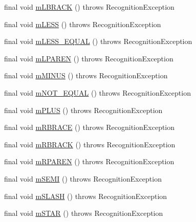 \begin{DoxyCompactItemize}
final void \hyperlink{classorg_1_1tzi_1_1use_1_1parser_1_1ocl_1_1_o_c_l_lexer_a42b9aa333e58bce7ce0967a51a318694}{m\-L\-B\-R\-A\-C\-K} ()  throws Recognition\-Exception 
\item 
final void \hyperlink{classorg_1_1tzi_1_1use_1_1parser_1_1ocl_1_1_o_c_l_lexer_a81843f6fa74e795661f7d3e13102f2b5}{m\-L\-E\-S\-S} ()  throws Recognition\-Exception 
\item 
final void \hyperlink{classorg_1_1tzi_1_1use_1_1parser_1_1ocl_1_1_o_c_l_lexer_a7a48716a6d69e4e96d5d1a8af6eb2747}{m\-L\-E\-S\-S\-\_\-\-E\-Q\-U\-A\-L} ()  throws Recognition\-Exception 
\item 
final void \hyperlink{classorg_1_1tzi_1_1use_1_1parser_1_1ocl_1_1_o_c_l_lexer_a8268b122b90467724d9953a17f870951}{m\-L\-P\-A\-R\-E\-N} ()  throws Recognition\-Exception 
\item 
final void \hyperlink{classorg_1_1tzi_1_1use_1_1parser_1_1ocl_1_1_o_c_l_lexer_ac78c30e5bfe199564bd00dbe08185555}{m\-M\-I\-N\-U\-S} ()  throws Recognition\-Exception 
\item 
final void \hyperlink{classorg_1_1tzi_1_1use_1_1parser_1_1ocl_1_1_o_c_l_lexer_a1b1d37ca767b3a0e3c2c9f7c875917a5}{m\-N\-O\-T\-\_\-\-E\-Q\-U\-A\-L} ()  throws Recognition\-Exception 
\item 
final void \hyperlink{classorg_1_1tzi_1_1use_1_1parser_1_1ocl_1_1_o_c_l_lexer_a75b738f6272dd7be405d82e39cd34253}{m\-P\-L\-U\-S} ()  throws Recognition\-Exception 
\item 
final void \hyperlink{classorg_1_1tzi_1_1use_1_1parser_1_1ocl_1_1_o_c_l_lexer_a28e9f866f1f062d0b69e951d1e029bb8}{m\-R\-B\-R\-A\-C\-E} ()  throws Recognition\-Exception 
\item 
final void \hyperlink{classorg_1_1tzi_1_1use_1_1parser_1_1ocl_1_1_o_c_l_lexer_a71252bae466b20065159d5517775c8cb}{m\-R\-B\-R\-A\-C\-K} ()  throws Recognition\-Exception 
\item 
final void \hyperlink{classorg_1_1tzi_1_1use_1_1parser_1_1ocl_1_1_o_c_l_lexer_a242993491c239e373c5d21f4dbe996a8}{m\-R\-P\-A\-R\-E\-N} ()  throws Recognition\-Exception 
\item 
final void \hyperlink{classorg_1_1tzi_1_1use_1_1parser_1_1ocl_1_1_o_c_l_lexer_acac44cb88a04fc3c1f445b2f92b47921}{m\-S\-E\-M\-I} ()  throws Recognition\-Exception 
\item 
final void \hyperlink{classorg_1_1tzi_1_1use_1_1parser_1_1ocl_1_1_o_c_l_lexer_a85b664890515cddbda70a7db1aec0b8a}{m\-S\-L\-A\-S\-H} ()  throws Recognition\-Exception 
\item 
final void \hyperlink{classorg_1_1tzi_1_1use_1_1parser_1_1ocl_1_1_o_c_l_lexer_a7073adc2141ea21b9319963d92a35c87}{m\-S\-T\-A\-R} ()  throws Recognition\-Exception 

\end{DoxyCompactItemize}
